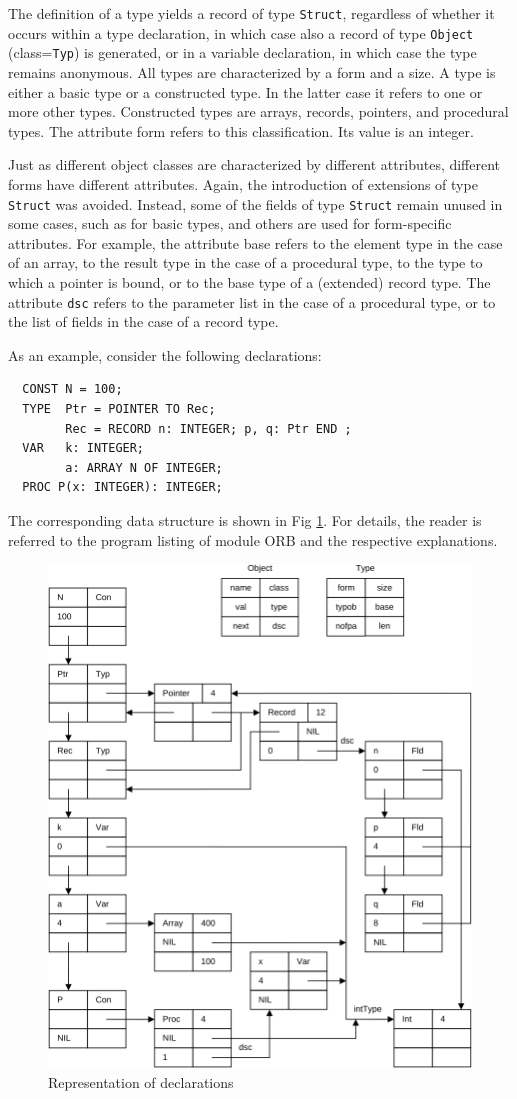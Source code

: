 The definition of a type yields a record of type \verb|Struct|, regardless of whether it occurs within
a type declaration, in which case also a record of type \verb|Object| (class=\verb|Typ|) is generated,
or in a variable declaration, in which case the type remains anonymous. All types are characterized by
a form and a size. A type is either a basic type or a constructed type. In the latter case it refers to
one or more other types. Constructed types are arrays, records, pointers, and procedural types. The
attribute form refers to this classification. Its value is an integer.

Just as different object classes are characterized by different attributes, different forms have
different attributes. Again, the introduction of extensions of type \verb|Struct| was avoided. Instead,
some of the fields of type \verb|Struct| remain unused in some cases, such as for basic types, and
others are used for form-specific attributes. For example, the attribute base refers to the element
type in the case of an array, to the result type in the case of a procedural type, to the type to which
a pointer is bound, or to the base type of a (extended) record type. The attribute \verb|dsc| refers
to the parameter list in the case of a procedural type, or to the list of fields in the case of
a record type.

As an example, consider the following declarations:
\begin{verbatim}
  CONST N = 100;
  TYPE  Ptr = POINTER TO Rec;
        Rec = RECORD n: INTEGER; p, q: Ptr END ;
  VAR   k: INTEGER;
        a: ARRAY N OF INTEGER;
  PROC P(x: INTEGER): INTEGER;
\end{verbatim}

The corresponding data structure is shown in Fig \ref{fig:declrep}. For details, the reader is
referred to the program listing of module ORB and the respective explanations.
\begin{figure}[h!]
  \centering
  \includegraphics[width=.8\textwidth]{i/C/5.png}
  \caption{Representation of declarations}
  \label{fig:declrep}
\end{figure}

